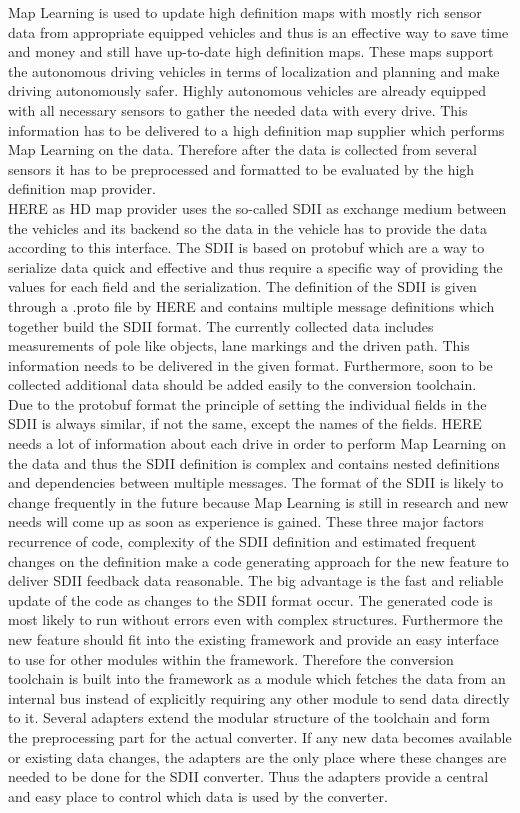 Map Learning is used to update high definition maps with mostly rich sensor data from appropriate equipped vehicles and thus is an effective way to save time and money and still have up-to-date high definition maps. These maps support the autonomous driving vehicles in terms of localization and planning and make driving autonomously safer. Highly autonomous vehicles are already equipped with all necessary sensors to gather the needed data with every drive. This information has to be delivered to a high definition map supplier which performs Map Learning on the data. Therefore after the data is collected from several sensors it has to be preprocessed and formatted to be evaluated by the high definition map provider.\\
HERE as HD map provider uses the so-called \acf{SDII} as exchange medium between the vehicles and its backend so the data in the vehicle has to provide the data according to this interface. The SDII is based on \acf{protobuf} which are a way to serialize data quick and effective and thus require a specific way of providing the values for each field and the serialization. The definition of the SDII is given through a .proto file by HERE and contains multiple message definitions which together build the SDII format. The currently collected data includes measurements of pole like objects, lane markings and the driven path. This information needs to be delivered in the given format. Furthermore, soon to be collected additional data should be added easily to the conversion toolchain.\\
Due to the protobuf format the principle of setting the individual fields in the SDII is always similar, if not the same, except the names of the fields. HERE needs a lot of information about each drive in order to perform Map Learning on the data and thus the SDII definition is complex and contains nested definitions and dependencies between multiple messages. The format of the SDII is likely to change frequently in the future because Map Learning is still in research and new needs will come up as soon as experience is gained. These three major factors recurrence of code, complexity of the SDII definition and estimated frequent changes on the definition make a code generating approach for the new feature to deliver SDII feedback data reasonable. The big advantage is the fast and reliable update of the code as changes to the SDII format occur. The generated code is most likely to run without errors even with complex structures. Furthermore the new feature should fit into the existing framework and provide an easy interface to use for other modules within the framework. Therefore the conversion toolchain is built into the framework as a module which fetches the data from an internal bus instead of explicitly requiring any other module to send data directly to it. Several adapters extend the modular structure of the toolchain and form the preprocessing part for the actual converter. If any new data becomes available or existing data changes, the adapters are the only place where these changes are needed to be done for the SDII converter. Thus the adapters provide a central and easy place to control which data is used by the converter.\\
